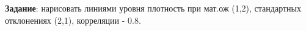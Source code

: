 \begin{enumerate}
    \textbf{Задание}: нарисовать линиями уровня плотность при мат.ож (1,2), стандартных отклонениях (2,1), корреляции - 0.8.


\end{enumerate}
